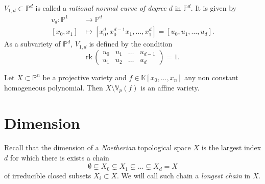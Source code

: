 \begin{ex}[$n = 1$: the rational normal curve of degree $d$]
	$V_{1,d} \subset \mathbb{P}^{d}$ is called a \textit{rational normal curve of degree} $d$ in $\mathbb{P}^{d}$.
	It is given by
	\begin{align}
		v_d: \mathbb{P}^{1} &\to \mathbb{P}^{d} \\
		\left[ x_0 , x_1 \right] &\mapsto \left[ x_0^d, x_0^{d-1}x_1 , \ldots , x_1^d \right] = 
		\left[ u_0, u_1 , \ldots , u_d \right]
	.\end{align} 
	As a subvariety of $\mathbb{P}^{d}$, $V_{1,d}$ is defined by the condition
	\begin{equation}
	\mathrm{rk}\, 
	\begin{pmatrix}
		u_0 & u_1 & \ldots & u_{d-1}\\
		u_1 & u_2 & \ldots & u_d
	\end{pmatrix} 
	= 1
	.\end{equation} 
\end{ex} 

\begin{cor}
	Let $X \subset \mathbb{P}^{n}$ be a projective variety and $f \in \mathbb{K}\left[x_0, \ldots, x_n \right]$ any non constant homogeneous polynomial.
	Then $X \setminus \mathbb{V}_p\left( f \right)$ is an affine variety.
\end{cor} 

\section{Dimension}
Recall that the dimension of a \textit{Noetherian} topological space $X$ is the largest
index $d$ for which there is exists a chain
\begin{equation}
\emptyset \subsetneq X_0 \subsetneq X_1 \subsetneq \ldots \subsetneq X_d = X
\end{equation} 
of irreducible closed subsets $X_i \subset X$.
We will call such chain a \textit{longest chain} in $X$.

